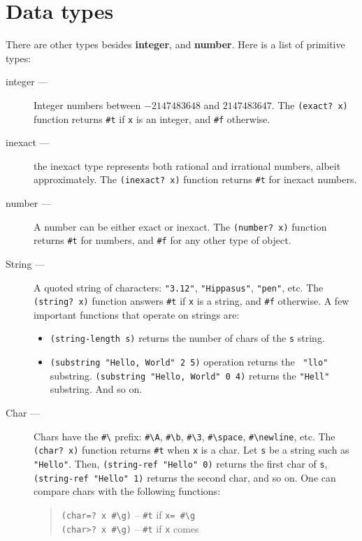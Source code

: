 \documentclass[a4paper,12pt]{book}
\begin{document}
\section{Data types}
There are other types
besides {\bf integer}, and {\bf number}. 
Here is a  list of primitive types:
\begin{description}
\item[integer ---] Integer numbers between $-2147483648$ and $2147483647$. 
The \verb|(exact? x)| function returns \verb|#t| if \verb|x|
is an integer, and \verb|#f| otherwise.
\item[inexact ---] the inexact type represents both
rational and irrational numbers, albeit approximately.
The \verb|(inexact? x)| function returns \verb|#t| for
inexact numbers.
\item[number ---] A number can be either exact or inexact.
The \verb|(number? x)| function returns \verb|#t| for numbers,
and \verb|#f| for any other type of object.
\item[String ---] A quoted string 
of characters: \verb|"3.12"|, \verb|"Hippasus"|, \verb|"pen"|, etc.
The \verb|(string? x)| function answers \verb|#t| 
if \verb|x| is a string, 
and \verb|#f| otherwise.
A few important functions that operate on strings are:
\begin{itemize}
\item \verb|(string-length s)| returns the number
of chars of the \verb|s| string.
\item\verb|(substring "Hello, World" 2 5)| operation
returns the \verb| "llo"| substring.
\verb|(substring "Hello, World" 0 4)| returns the
\verb|"Hell"| substring. And so on.
\end{itemize}
\item[Char ---] Chars have the \verb|#\|
  prefix: 
\verb|#\A|,
\verb|#\b|, \verb|#\3|, \verb|#\space|,
\verb|#\newline|, etc.
The \verb|(char? x)| function returns \verb|#t|
when \verb|x| is a char.
Let \verb|s| be
a string such as \verb|"Hello"|. Then,
\verb|(string-ref "Hello" 0)|
returns the first char of \verb|s|,
\verb|(string-ref "Hello" 1)| returns
the second char, and so on. One can compare
chars with the following functions:
\begin{quote}
\verb|(char=? x #\g)| -- \verb|#t| if \verb|x= #\g|\\
\verb|(char>? x #\g)| -- \verb|#t| if \verb|x| comes

\end{quote}
\end{description}
\end{document}
